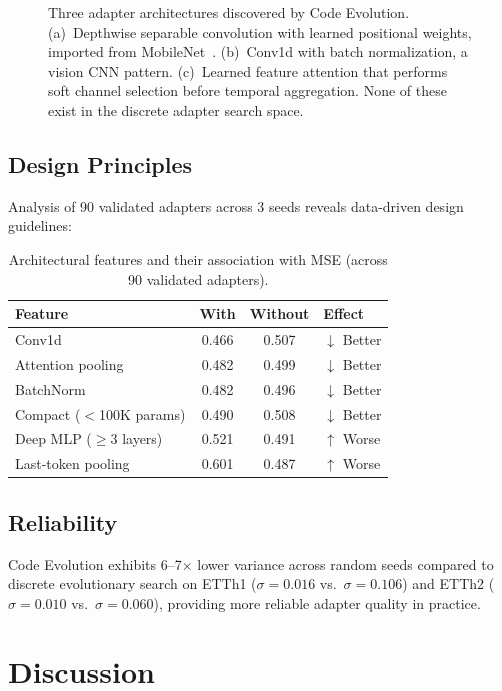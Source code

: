 \documentclass{article}
\begin{document}
\begin{figure}[h]
\begin{tikzpicture}
\end{tikzpicture}
\caption{Three adapter architectures discovered by Code Evolution. (a)~Depthwise separable convolution with learned positional weights, imported from MobileNet~\cite{howard2017mobilenets}. (b)~Conv1d with batch normalization, a vision CNN pattern. (c)~Learned feature attention that performs soft channel selection before temporal aggregation. None of these exist in the discrete adapter search space.}
\label{fig:architectures}
\end{figure}

\subsection{Design Principles}

Analysis of 90 validated adapters across 3 seeds reveals data-driven design guidelines:

\begin{table}[h]
\centering
\caption{Architectural features and their association with MSE (across 90 validated adapters).}
\label{tab:design}
\begin{tabular}{@{}lccl@{}}
\toprule
Feature & With & Without & Effect \\
\midrule
Conv1d & 0.466 & 0.507 & $\downarrow$ Better \\
Attention pooling & 0.482 & 0.499 & $\downarrow$ Better \\
BatchNorm & 0.482 & 0.496 & $\downarrow$ Better \\
Compact ($<$100K params) & 0.490 & 0.508 & $\downarrow$ Better \\
\midrule
Deep MLP ($\geq$3 layers) & 0.521 & 0.491 & $\uparrow$ Worse \\
Last-token pooling & 0.601 & 0.487 & $\uparrow$ Worse \\
\bottomrule
\end{tabular}
\end{table}

\subsection{Reliability}

Code Evolution exhibits 6--7$\times$ lower variance across random seeds compared to discrete evolutionary search on ETTh1 ($\sigma{=}0.016$ vs.\ $\sigma{=}0.106$) and ETTh2 ($\sigma{=}0.010$ vs.\ $\sigma{=}0.060$), providing more reliable adapter quality in practice.

\section{Discussion}
\end{document}
